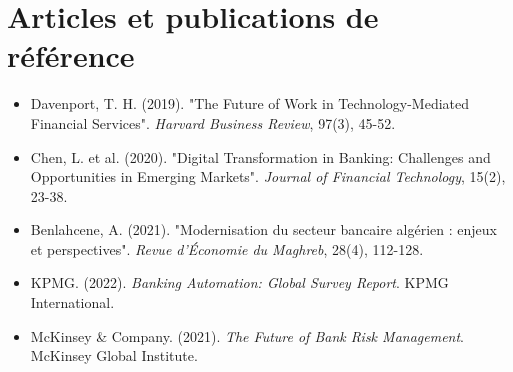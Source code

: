 \section{Articles et publications de référence}

\begin{itemize}
    \item Davenport, T. H. (2019). "The Future of Work in Technology-Mediated Financial Services". \textit{Harvard Business Review}, 97(3), 45-52.
    \item Chen, L. et al. (2020). "Digital Transformation in Banking: Challenges and Opportunities in Emerging Markets". \textit{Journal of Financial Technology}, 15(2), 23-38.
    \item Benlahcene, A. (2021). "Modernisation du secteur bancaire algérien : enjeux et perspectives". \textit{Revue d'Économie du Maghreb}, 28(4), 112-128.
    \item KPMG. (2022). \textit{Banking Automation: Global Survey Report}. KPMG International.
    \item McKinsey & Company. (2021). \textit{The Future of Bank Risk Management}. McKinsey Global Institute.
\end{itemize}